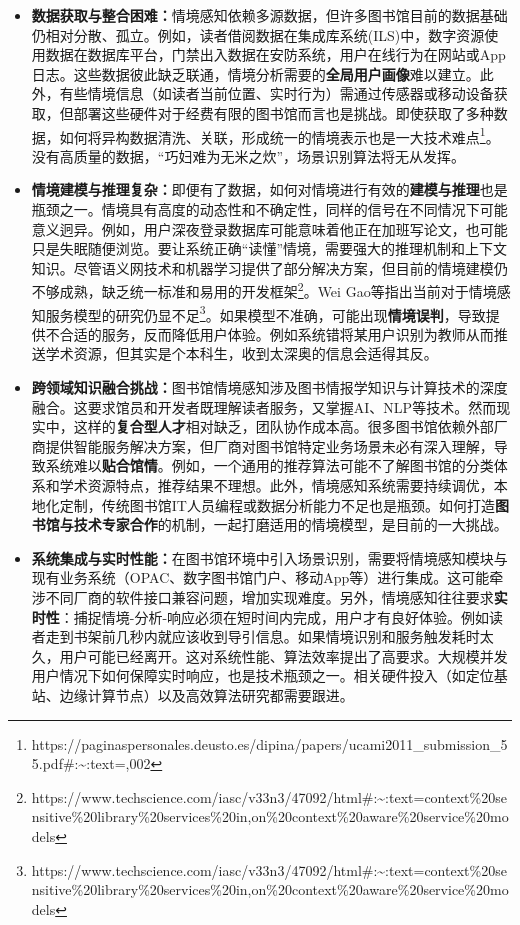 \documentclass[
  letterpaper,
]{scrbook}
\begin{document}
\begin{itemize}
\item
  \textbf{数据获取与整合困难：}情境感知依赖多源数据，但许多图书馆目前的数据基础仍相对分散、孤立。例如，读者借阅数据在集成库系统(ILS)中，数字资源使用数据在数据库平台，门禁出入数据在安防系统，用户在线行为在网站或App日志。这些数据彼此缺乏联通，情境分析需要的\textbf{全局用户画像}难以建立。此外，有些情境信息（如读者当前位置、实时行为）需通过传感器或移动设备获取，但部署这些硬件对于经费有限的图书馆而言也是挑战。即使获取了多种数据，如何将异构数据清洗、关联，形成统一的情境表示也是一大技术难点\footnote{https://paginaspersonales.deusto.es/dipina/papers/ucami2011\_submission\_55.pdf\#:\textasciitilde:text=,002}。没有高质量的数据，``巧妇难为无米之炊''，场景识别算法将无从发挥。
\item
  \textbf{情境建模与推理复杂：}即便有了数据，如何对情境进行有效的\textbf{建模与推理}也是瓶颈之一。情境具有高度的动态性和不确定性，同样的信号在不同情况下可能意义迥异。例如，用户深夜登录数据库可能意味着他正在加班写论文，也可能只是失眠随便浏览。要让系统正确``读懂''情境，需要强大的推理机制和上下文知识。尽管语义网技术和机器学习提供了部分解决方案，但目前的情境建模仍不够成熟，缺乏统一标准和易用的开发框架\footnote{https://www.techscience.com/iasc/v33n3/47092/html\#:\textasciitilde:text=context\%20sensitive\%20library\%20services\%20in,on\%20context\%20aware\%20service\%20models}。Wei
  Gao等指出当前对于情境感知服务模型的研究仍显不足\footnote{https://www.techscience.com/iasc/v33n3/47092/html\#:\textasciitilde:text=context\%20sensitive\%20library\%20services\%20in,on\%20context\%20aware\%20service\%20models}。如果模型不准确，可能出现\textbf{情境误判}，导致提供不合适的服务，反而降低用户体验。例如系统错将某用户识别为教师从而推送学术资源，但其实是个本科生，收到太深奥的信息会适得其反。
\item
  \textbf{跨领域知识融合挑战：}图书馆情境感知涉及图书情报学知识与计算技术的深度融合。这要求馆员和开发者既理解读者服务，又掌握AI、NLP等技术。然而现实中，这样的\textbf{复合型人才}相对缺乏，团队协作成本高。很多图书馆依赖外部厂商提供智能服务解决方案，但厂商对图书馆特定业务场景未必有深入理解，导致系统难以\textbf{贴合馆情}。例如，一个通用的推荐算法可能不了解图书馆的分类体系和学术资源特点，推荐结果不理想。此外，情境感知系统需要持续调优，本地化定制，传统图书馆IT人员编程或数据分析能力不足也是瓶颈。如何打造\textbf{图书馆与技术专家合作}的机制，一起打磨适用的情境模型，是目前的一大挑战。
\item
  \textbf{系统集成与实时性能：}在图书馆环境中引入场景识别，需要将情境感知模块与现有业务系统（OPAC、数字图书馆门户、移动App等）进行集成。这可能牵涉不同厂商的软件接口兼容问题，增加实现难度。另外，情境感知往往要求\textbf{实时性}：捕捉情境-分析-响应必须在短时间内完成，用户才有良好体验。例如读者走到书架前几秒内就应该收到导引信息。如果情境识别和服务触发耗时太久，用户可能已经离开。这对系统性能、算法效率提出了高要求。大规模并发用户情况下如何保障实时响应，也是技术瓶颈之一。相关硬件投入（如定位基站、边缘计算节点）以及高效算法研究都需要跟进。

\end{itemize}
\end{document}
